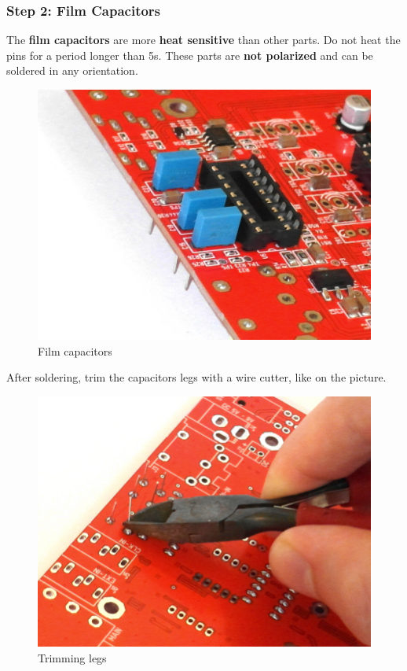 \documentclass{scrartcl}
\begin{document}
\pagebreak
\subsubsection{Step 2: Film Capacitors}

The \textbf{film capacitors} are more \textbf{heat sensitive} than other parts. Do not heat the pins for a period longer than 5s.
These parts are \textbf{not polarized} and can be soldered in any orientation.

\begin{figure}[!ht]
    \begin{center}
        \includegraphics[scale=0.25]{assets/pcb-caps.jpg}
        \caption{Film capacitors}
    \end{center}
\end{figure}

After soldering, trim the capacitors legs with a wire cutter, like on the picture.

\begin{figure}[!ht]
    \begin{center}
        \includegraphics[scale=0.25]{assets/pcb-legs.jpg}
        \caption{Trimming legs}
    \end{center}
\end{figure}
\end{document}
